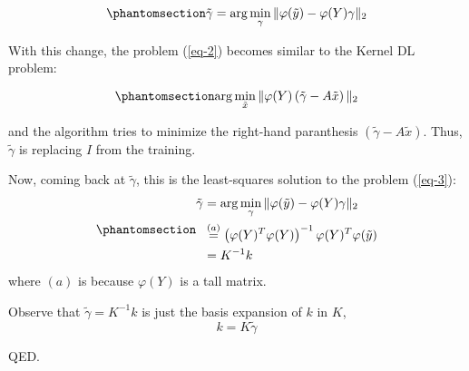 \documentclass[
  letterpaper,
  DIV=11,
  numbers=noendperiod]{scrartcl}
\begin{document}
\begin{equation}\phantomsection\label{eq-3}{\tilde{\gamma} = \arg\min_{\gamma} \|\varphi(\tilde{y}) - \varphi(Y) \gamma\|_2}\end{equation}

With this change, the problem (\ref{eq-2}) becomes similar to the Kernel
DL problem:

\begin{equation}\phantomsection\label{eq-4}{\arg\min_{\tilde{x}} \|\varphi(Y) \left( \tilde{\gamma} - A \tilde{x} \right) \|_2}\end{equation}

and the algorithm tries to minimize the right-hand paranthesis
\((\tilde{\gamma} - A \tilde{x})\). Thus, \(\tilde{\gamma}\) is
replacing \(I\) from the training.

Now, coming back at \(\tilde{\gamma}\), this is the least-squares
solution to the problem (\ref{eq-3}):
\begin{equation}\phantomsection\label{eq-5}{\begin{align}
\tilde{\gamma} &= \arg\min_{\gamma} \|\varphi(\tilde{y}) - \varphi(Y) \gamma\|_2 \\
&\overset{(a)}{=} \left( \varphi(Y)^T \varphi(Y) \right)^{-1} \varphi(Y)^T \varphi(\tilde{y}) \\
&= K^{-1} k
\end{align}}\end{equation} where \((a)\) is because \(\varphi(Y)\) is a
tall matrix.

Observe that \(\tilde{\gamma}= K^{-1} k\) is just the basis expansion of
\(k\) in \(K\), \[k = K \tilde{\gamma}\]

QED.
\end{document}
